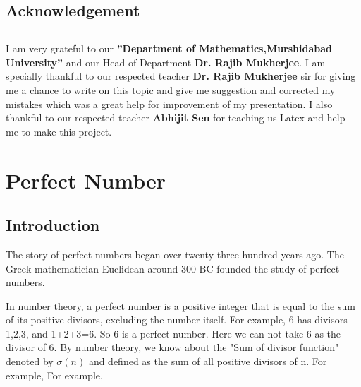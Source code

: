 \documentclass[12pt,,a4paper]{book}
\begin{document}



\section*{Acknowledgement}
\section*{}
I am very grateful to our \textbf{”Department of Mathematics,Murshidabad
University”} and our Head of Department \textbf{Dr. Rajib Mukherjee}.
I am specially thankful to our respected teacher \textbf{Dr. Rajib Mukherjee} sir for
giving me a chance to write on this topic and give me suggestion and
corrected my mistakes which was a great help for improvement of my
presentation.
I also thankful to our respected teacher \textbf{Abhijit Sen} for teaching us Latex
and help me to make this project.



\tableofcontents
\clearpage


 \fontsize{14pt}{10pt}\selectfont

 
\chapter*{Perfect Number}
\section{Introduction}
The story of perfect numbers began over twenty-three hundred years ago. The Greek mathematician Euclidean around 300 BC founded the study of perfect numbers.\par
	In number theory, a perfect number is a  positive integer that is equal to the sum of its positive divisors, excluding the number itself. For example, 6 has divisors 1,2,3, and 1+2+3=6. So 6 is a perfect number. Here we can not take 6 as the divisor of 6. By number theory, we know about the "Sum of divisor function" denoted by   $\sigma(n)$   and defined as the sum of all positive divisors of n. For example,  For example,  
\end{document}
